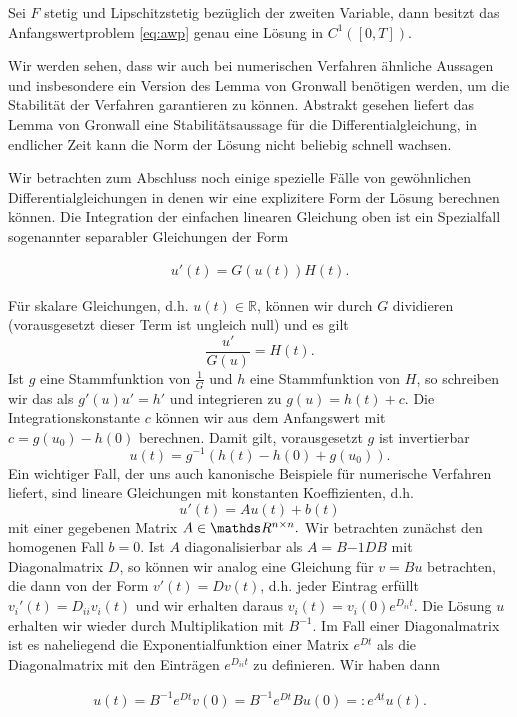 \begin{theorem}{}{}
Sei $F$ stetig und Lipschitzstetig bezüglich der zweiten Variable, dann besitzt das Anfangswertproblem \eqref{eq:awp} genau eine Lösung in $C^1([0,T])$. 
\end{theorem}

Wir werden sehen, dass wir auch bei numerischen Verfahren ähnliche Aussagen und insbesondere ein Version des Lemma von Gronwall  benötigen werden, um die Stabilität der Verfahren garantieren zu können. Abstrakt gesehen liefert das Lemma von Gronwall eine Stabilitätsaussage für die Differentialgleichung, in endlicher Zeit kann die Norm der Lösung nicht beliebig schnell wachsen. 

Wir betrachten zum Abschluss noch einige spezielle Fälle von gewöhnlichen Differentialgleichungen in denen wir eine explizitere Form der Lösung berechnen können. Die Integration der einfachen linearen Gleichung oben ist ein Spezialfall sogenannter separabler Gleichungen der Form

\begin{align*}
u'(t) = G(u(t)) H(t).
\end{align*}

Für skalare Gleichungen, d.h. $u(t) \in \mathbb{R}$, können wir durch $G$ dividieren (vorausgesetzt dieser Term ist ungleich null) und es gilt 
$$ \frac{u'}{G(u)} = H(t). $$
Ist $g$ eine Stammfunktion von $\frac{1}G$ und $h$ eine Stammfunktion von $H$, so schreiben wir das als
$ g'(u) u' = h'$ und integrieren zu  $g(u) = h(t) + c$. Die Integrationskonstante $c$ können wir aus dem Anfangswert mit 
$c = g(u_0) - h(0)$ berechnen. 
Damit gilt, vorausgesetzt $g$ ist invertierbar
$$ u(t) = g^{-1} (h(t) - h(0) + g(u_0)). $$
%
Ein wichtiger Fall, der uns auch kanonische Beispiele für numerische Verfahren liefert, sind lineare Gleichungen mit konstanten Koeffizienten, d.h. 
$$ u'(t) = A u(t) + b(t) $$
mit einer gegebenen Matrix $A \in \R^{n \times n}.$ Wir betrachten zunächst den homogenen Fall $b=0$. Ist $A$ diagonalisierbar als $A = B{-1} D B$ mit Diagonalmatrix $D$, so können wir analog eine Gleichung für $v = B u$ betrachten, die dann von der Form
$v'(t) = D v(t)$, d.h. jeder Eintrag erfüllt $v_i'(t) = D_{ii} v_i(t)$ und wir erhalten daraus $v_i(t) = v_i(0) e^{D_{ii}t}.$
Die Lösung $u$ erhalten wir wieder durch Multiplikation mit $B^{-1}$. Im Fall einer Diagonalmatrix ist es naheliegend die Exponentialfunktion einer Matrix $e^{Dt}$ als die Diagonalmatrix mit den Einträgen $e^{D_{ii}t}$ zu definieren. Wir haben dann

\begin{align*}
u(t) = B^{-1} e^{Dt} v(0) =  B^{-1} e^{Dt} B u(0) =: e^{At} u(t).
\end{align*}


